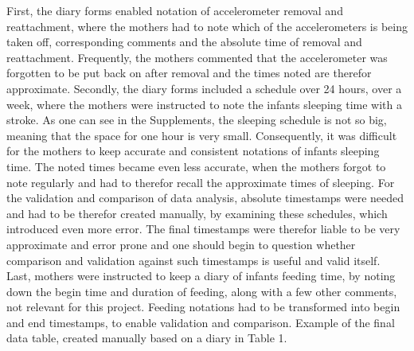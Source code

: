 \documentclass{article}
\begin{document}
{First, the diary forms enabled notation of accelerometer removal and reattachment, where the mothers had to note which of the accelerometers is being taken off, corresponding comments and the absolute time of removal and reattachment. Frequently, the mothers commented that the accelerometer was forgotten to be put back on after removal and the times noted are therefor approximate. Secondly, the diary forms included a schedule over 24 hours, over a week, where the mothers were instructed to note the infants sleeping time with a stroke. As one can see in the Supplements, the sleeping schedule is not so big, meaning that the space for one hour is very small. Consequently, it was difficult for the mothers to keep accurate and consistent notations of infants sleeping time. The noted times became even less accurate, when the mothers forgot to note regularly and had to therefor recall the approximate times of sleeping. For the validation and comparison of data analysis, absolute timestamps were needed and had to be therefor created manually, by examining these schedules, which introduced even more error. The final timestamps were therefor liable to be very approximate and error prone and one should begin to question whether comparison and validation against such timestamps is useful and valid itself. Last, mothers were instructed to keep a diary of infants feeding time, by noting down the begin time and duration of feeding, along with a few other comments, not relevant for this project. Feeding notations had to be transformed into begin and end timestamps, to enable validation and comparison. Example of the final data table, created manually based on a diary in Table 1.

}
\end{document}
